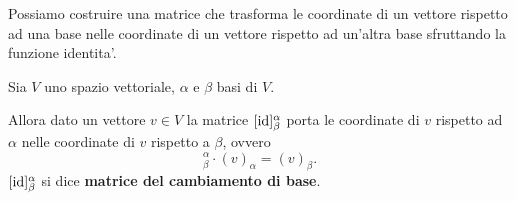 Possiamo costruire una matrice che trasforma le coordinate di un vettore rispetto ad una base nelle coordinate di un vettore rispetto ad un'altra base sfruttando la funzione identita'.

\begin{definition}
    Sia $V$ uno spazio vettoriale, $\alpha$ e $\beta$ basi di $V$. 
    
    Allora dato un vettore $v \in V$ la matrice $[\operatorname{id}]^{\alpha}_{\beta}$ porta le coordinate di $v$ rispetto ad $\alpha$ nelle coordinate di $v$ rispetto a $\beta$, ovvero \begin{equation}
        [\id]^{\alpha}_{\beta} \cdot (v)_{\alpha} = (v)_{\beta}.
    \end{equation}
    $[\operatorname{id}]^{\alpha}_{\beta}$ si dice \textbf{matrice del cambiamento di base}.
\end{definition}

